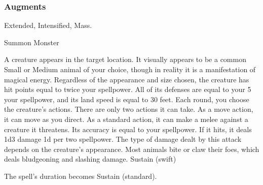 \subsubsection{Augments}
 Extended, Intensified, Mass.
\begin{spellsection}{Summon Monster}
\begin{spellheader}
\end{spellheader}
\begin{spellcontent}
\begin{spelltargetinginfo}
\end{spelltargetinginfo}
\begin{spelleffects}
\spelleffect
A creature appears in the target location.
It visually appears to be a common Small or Medium animal of your choice, though in reality it is a manifestation of magical energy.
Regardless of the appearance and size chosen, the creature has hit points equal to twice your spellpower.
All of its defenses are equal to your 5 \add your spellpower, and its land speed is equal to 30 feet.
Each round, you choose the creature's actions.
There are only two actions it can take.
As a move action, it can move as you direct.
As a standard action, it can make a melee  against a creature it threatens.
Its accuracy is equal to your spellpower.
If it hits, it deals 1d3 damage \plus1d per two spellpower.
The type of damage dealt by this attack depends on the creature's appearance.
Most animals bite or claw their foes, which deals bludgeoning and slashing damage.
\spelldur Sustain (swift)
\end{spelleffects}
\end{spellcontent}
\begin{spellfooter}
\miscastexplode
\end{spellfooter}
\begin{spellcantrip}
The spell's duration becomes Sustain (standard).
\end{spellcantrip}
\end{spellsection}
